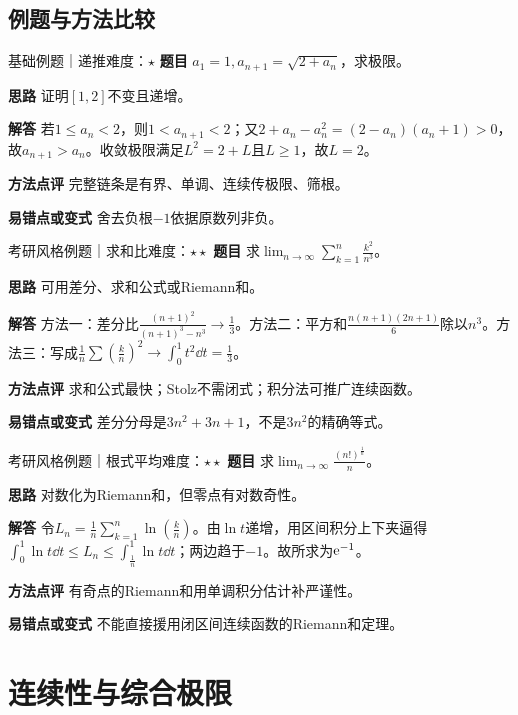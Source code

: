 \subsection{例题与方法比较}
\begin{example}{基础例题｜递推}{难度：$\star$}
\label{ex:1:10}\textbf{题目} $a_1=1,a_{n+1}=\sqrt{2+a_n}$，求极限。\par
\textbf{思路} 证明$[1,2]$不变且递增。\par
\textbf{解答} 若$1\le a_n<2$，则$1<a_{n+1}<2$；又$2+a_n-a_n^2=(2-a_n)(a_n+1)>0$，故$a_{n+1}>a_n$。收敛极限满足$L^2=2+L$且$L\ge1$，故$L=2$。\par
\textbf{方法点评} 完整链条是有界、单调、连续传极限、筛根。\par
\textbf{易错点或变式} 舍去负根$-1$依据原数列非负。
\end{example}
\begin{example}{考研风格例题｜求和比}{难度：$\star\star$}
\label{ex:1:11}\textbf{题目} 求$\lim_{n\to\infty}\sum_{k=1}^n \frac{k^2}{n^3}$。\par
\textbf{思路} 可用差分、求和公式或Riemann和。\par
\textbf{解答} 方法一：差分比$\frac{(n+1)^2}{(n+1)^3-n^3}\to\frac{1}{3}$。方法二：平方和$\frac{n(n+1)(2n+1)}{6}$除以$n^3$。方法三：写成$\frac1n\sum(\frac{k}{n})^2\to\int_0^1t^2\dd t=\frac{1}{3}$。\par
\textbf{方法点评} 求和公式最快；Stolz不需闭式；积分法可推广连续函数。\par
\textbf{易错点或变式} 差分分母是$3n^2+3n+1$，不是$3n^2$的精确等式。
\end{example}
\begin{example}{考研风格例题｜根式平均}{难度：$\star\star$}
\label{ex:1:12}\textbf{题目} 求$\lim_{n\to\infty}\frac{(n!)^{\frac{1}{n}}}{n}$。\par
\textbf{思路} 对数化为Riemann和，但零点有对数奇性。\par
\textbf{解答} 令$L_n=\frac1n\sum_{k=1}^n\ln(\frac{k}{n})$。由$\ln t$递增，用区间积分上下夹逼得$\int_0^1\ln t\dd t\le L_n\le\int_{\frac{1}{n}}^1\ln t\dd t$；两边趋于$-1$。故所求为$\mathrm{e}^{-1}$。\par
\textbf{方法点评} 有奇点的Riemann和用单调积分估计补严谨性。\par
\textbf{易错点或变式} 不能直接援用闭区间连续函数的Riemann和定理。
\end{example}
\section{连续性与综合极限}\label{sec:1:5}
